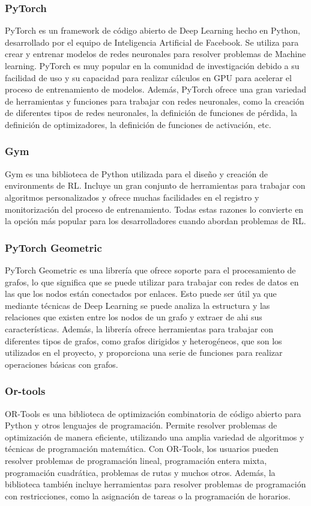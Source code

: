 \subsubsection{PyTorch}
PyTorch es un framework de código abierto de Deep Learning hecho en Python, desarrollado por el equipo 
de Inteligencia Artificial de Facebook. Se utiliza para crear y entrenar modelos de redes neuronales para resolver 
problemas de Machine learning. PyTorch es muy popular en la comunidad de investigación debido a su facilidad de uso 
y su capacidad para realizar cálculos en GPU para acelerar el proceso de entrenamiento de modelos. Además, PyTorch
ofrece una gran variedad de herramientas y funciones para trabajar con redes neuronales, como la creación de
diferentes tipos de redes neuronales, la definición de funciones de pérdida, la definición de optimizadores, la 
definición de funciones de activación, etc.

\subsubsection{Gym}
Gym es una biblioteca de Python utilizada para el diseño y creación de environments de RL. Incluye un 
gran conjunto de herramientas para trabajar con algoritmos personalizados y ofrece muchas facilidades en 
el registro y monitorización del proceso de entrenamiento. Todas estas razones lo convierte en la opción más popular 
para los desarrolladores cuando abordan problemas de RL.

\subsubsection{PyTorch Geometric}
PyTorch Geometric es una librería que ofrece soporte para el procesamiento de grafos, lo que significa 
que se puede utilizar para trabajar con redes de datos en las que los nodos están conectados por enlaces. 
Esto puede ser útil ya que mediante técnicas de Deep Learning se puede analiza la estructura y las 
relaciones que existen entre los nodos de un grafo y extraer de ahi sus características. Además, la 
librería ofrece herramientas para trabajar con diferentes tipos de grafos, como grafos dirigidos y heterogéneos, 
que son los utilizados en el proyecto, y proporciona una serie de funciones para realizar 
operaciones básicas con grafos.

\subsubsection{Or-tools}
OR-Tools es una biblioteca de optimización combinatoria de código abierto para Python y otros 
lenguajes de programación. Permite resolver problemas de optimización de manera eficiente, utilizando una 
amplia variedad de algoritmos y técnicas de programación matemática. Con OR-Tools, los usuarios pueden 
resolver problemas de programación lineal, programación entera mixta, programación cuadrática, 
problemas de rutas y muchos otros. Además, la biblioteca también incluye herramientas para resolver 
problemas de programación con restricciones, como la asignación de tareas o la programación de horarios.

